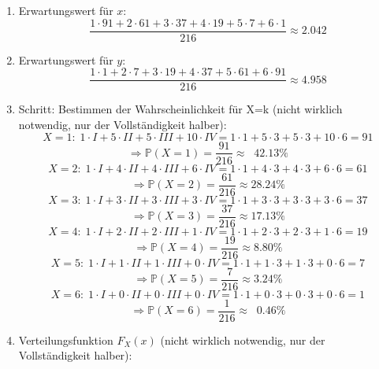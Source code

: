 \documentclass{scrreprt}
\begin{document}
\begin{uebsp}
\begin{Answer}
\begin{enumerate}[1.]
        \item Erwartungswert für $x$:
            \[\frac{1\cdot 91+2\cdot 61+3\cdot 37+4\cdot 19+5\cdot 7+6\cdot 1}{216}\approx2.042\]
        \item Erwartungswert für $y$:
            \[\frac{1\cdot 1+2\cdot 7+3\cdot 19+4\cdot 37+5\cdot 61+6\cdot 91}{216}\approx4.958\]

        \item Schritt: Bestimmen der Wahrscheinlichkeit für X=k (nicht wirklich notwendig, nur der Vollständigkeit halber):
            \[X=1:\;1\cdot I+5\cdot II+5\cdot III+10\cdot IV=1\cdot1+5\cdot3+5\cdot3+10\cdot6=91\]
                \[\Rightarrow\mathbb{P}(X=1)=\frac{91}{216}\approx \;\;42.13\%\]
            \[X=2:\;1\cdot I+4\cdot II+4\cdot III+6\cdot IV=1\cdot1+4\cdot3+4\cdot3+6\cdot6=61\]
                \[\Rightarrow\mathbb{P}(X=2)=\frac{61}{216}\approx 28.24\%\]
            \[X=3:\;1\cdot I+3\cdot II+3\cdot III+3\cdot IV=1\cdot1+3\cdot3+3\cdot3+3\cdot6=37\]
                \[\Rightarrow\mathbb{P}(X=3)=\frac{37}{216}\approx 17.13\%\]
            \[X=4:\;1\cdot I+2\cdot II+2\cdot III+1\cdot IV=1\cdot1+2\cdot3+2\cdot3+1\cdot6=19\]
                \[\Rightarrow\mathbb{P}(X=4)=\frac{19}{216}\approx 8.80\%\]
            \[X=5:\;1\cdot I+1\cdot II+1\cdot III+0\cdot IV=1\cdot1+1\cdot3+1\cdot3+0\cdot6=7\]
                \[\Rightarrow\mathbb{P}(X=5)=\frac{7}{216}\approx 3.24\%\]
            \[X=6:\;1\cdot I+0\cdot II+0\cdot III+0\cdot IV=1\cdot1+0\cdot3+0\cdot3+0\cdot6=1\]
                \[\Rightarrow\mathbb{P}(X=6)=\frac{1}{216}\approx \;\;0.46\%\]
        \item Verteilungsfunktion $F_X(x)$ (nicht wirklich notwendig, nur der Vollständigkeit halber):
            \begin{multicols}{2}

                \begin{tikzpicture}[scale=0.85]
                    
                \end{tikzpicture}


\end{multicols}
\end{enumerate}
\end{Answer}
\end{uebsp}
\end{document}

